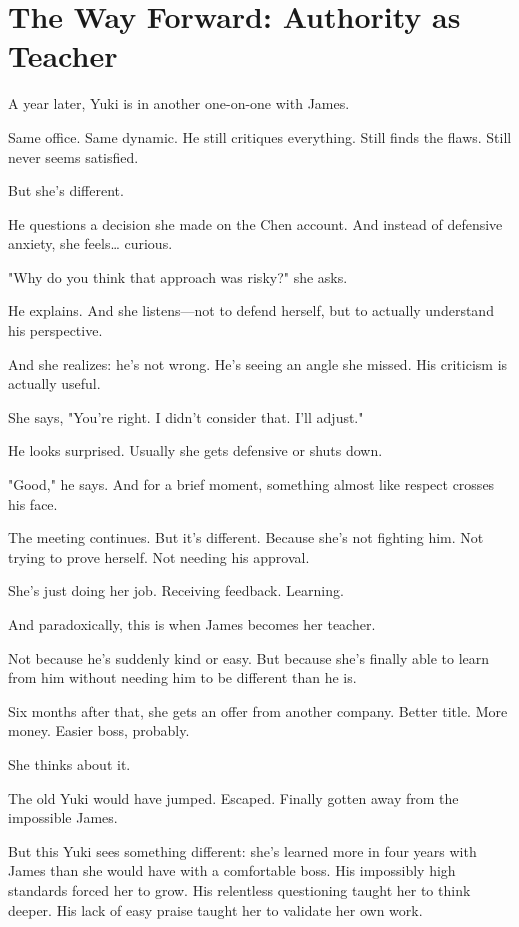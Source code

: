 \documentclass[11pt,twoside]{book}
\begin{document}
\section*{The Way Forward: Authority as Teacher}

A year later, Yuki is in another one-on-one with James.

Same office. Same dynamic. He still critiques everything. Still finds the flaws. Still never seems satisfied.

But she's different.

He questions a decision she made on the Chen account. And instead of defensive anxiety, she feels\ldots{} curious.

"Why do you think that approach was risky?" she asks.

He explains. And she listens—not to defend herself, but to actually understand his perspective.

And she realizes: he's not wrong. He's seeing an angle she missed. His criticism is actually useful.

She says, "You're right. I didn't consider that. I'll adjust."

He looks surprised. Usually she gets defensive or shuts down.

"Good," he says. And for a brief moment, something almost like respect crosses his face.

The meeting continues. But it's different. Because she's not fighting him. Not trying to prove herself. Not needing his approval.

She's just doing her job. Receiving feedback. Learning.

And paradoxically, this is when James becomes her teacher.

Not because he's suddenly kind or easy. But because she's finally able to learn from him without needing him to be different than he is.

Six months after that, she gets an offer from another company. Better title. More money. Easier boss, probably.

She thinks about it.

The old Yuki would have jumped. Escaped. Finally gotten away from the impossible James.

But this Yuki sees something different: she's learned more in four years with James than she would have with a comfortable boss. His impossibly high standards forced her to grow. His relentless questioning taught her to think deeper. His lack of easy praise taught her to validate her own work.
\end{document}
